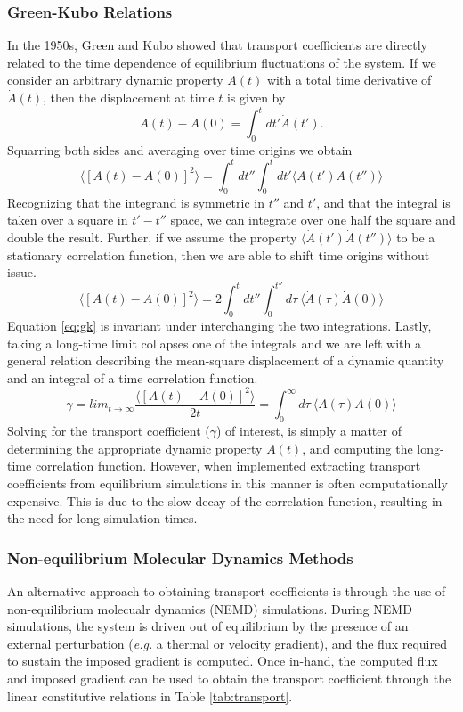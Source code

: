 \subsubsection{Green-Kubo Relations}
In the 1950s, Green and Kubo showed that transport coefficients
are directly related to the time dependence of equilibrium
fluctuations of the system. If we consider an arbitrary dynamic
property $A(t)$ with a total time derivative of $\dot{A}(t)$, then the
displacement at time $t$ is given by
\begin{equation}
A(t) - A(0) = \int_0^t dt' \dot{A}(t').
\end{equation}
Squarring both sides and averaging over time origins we obtain 
\begin{equation}
\langle [A(t) - A(0)]^2 \rangle = \int_0^t dt'' \int_0^t dt' \langle
\dot{A}(t') \dot{A}(t'') \rangle
\end{equation}
Recognizing that the integrand is symmetric in $t''$ and $t'$, and
that the integral is taken over a square in $t'-t''$ space, we can
integrate over one half the square and double the result. Further, if
we assume the property $\langle \dot{A}(t') \dot{A}(t'') \rangle$ to
be a stationary correlation function, then we are able to shift time
origins without issue. 
\begin{equation}\label{eq:gk}
  \langle [A(t) - A(0)]^2 \rangle = 2 \int_0^t dt'' \int_0^{t''} d\tau ~
  \langle \dot{A}(\tau ) \dot{A}(0) \rangle
\end{equation}
Equation \ref{eq:gk} is invariant under interchanging the two
integrations. Lastly, taking a long-time limit collapses one of the
integrals and we are left with a general relation describing the
mean-square displacement of a dynamic quantity and an integral of a
time correlation function.
\begin{equation}\label{eq:gk2}
 \gamma =  lim_{t \rightarrow \infty} \frac{\langle[ A(t) - A(0)]^2 \rangle}{2t} =
  \int_0^{\infty} d\tau ~ \langle \dot{A}(\tau ) \dot{A}(0) \rangle
\end{equation}
Solving for the transport coefficient ($\gamma$) of interest, is
simply a matter of determining the appropriate dynamic property
$A(t)$, and computing the long-time correlation function. However,
when implemented extracting transport coefficients from equilibrium
simulations in this manner is often computationally expensive. This is
due to the slow decay of the correlation function, resulting in the
need for long simulation times.

\subsubsection{Non-equilibrium Molecular Dynamics Methods}
An alternative approach to obtaining transport coefficients is through
the use of non-equilibrium molecualr dynamics (NEMD) simulations.
During NEMD simulations, the system is driven out of equilibrium by
the presence of an external perturbation (\textit{e.g.} a thermal or
velocity gradient), and the flux required to sustain the imposed
gradient is computed. Once in-hand, the computed flux and imposed
gradient can be used to obtain the transport coefficient through the
linear constitutive relations in Table \ref{tab:transport}.

